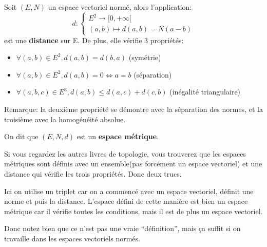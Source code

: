 \documentclass{article}
\begin{document}
\begin{tcolorbox}[colback=red!5!white,colframe=red!75!black,title=Définition 1.3]

Soit $(E,N)$ un espace vectoriel normé, alors l'application:
\[
d : 
\begin{cases} 
E^{2} \to [ 0, +\infty [ \\
(a,b) \mapsto d(a,b) = N(a-b)
\end{cases}
\]
est une \textbf{distance} sur E. De plus, elle vérifie 3 propriétés:


\begin{itemize}
 \item $\forall (a,b)\in E^{2}, d(a,b) = d(b,a)$ \hfill (symétrie)
 \item $\forall (a,b)\in E^{2}, d(a,b) = 0 \Longleftrightarrow a=b$ \hfill (séparation)
 \item $\forall (a,b,c) \in E^{3}, d(a,b) \leq d(a,c) + d(c,b)$ \hfill (inégalité triangulaire)
\end{itemize}

\tcblower

Remarque: la deuxième propriété se démontre avec la séparation des normes, et la troisième avec la homogénéité absolue.



\end{tcolorbox}

\begin{tcolorbox}[colback=red!5!white,colframe=red!75!black,title=Définition 1.4]

On dit que $(E,N,d)$ est un \textbf{espace métrique}.

\end{tcolorbox}

\begin{tcolorbox}[colback=purple!5!white,colframe=purple!75!black,title=Remarque de Corentin]

Si vous regardez les autres livres de topologie, vous trouverez que les espaces métriques sont définis avec un ensemble(pas forcément un espace vectoriel) et une distance qui vérifie les trois propriétés. Donc deux trucs.

Ici on utilise un triplet car on a commencé avec un espace vectoriel, définit une norme et puis la distance. L'espace défini de cette manière est bien un espace métrique car il vérifie toutes les conditions, mais il est de plus un espace vectoriel.

Donc notez bien que ce n'est pas une vraie ``définition'', mais \c ca suffit si on travaille dans les espaces vectoriels normés.

\end{tcolorbox}
\end{document}

